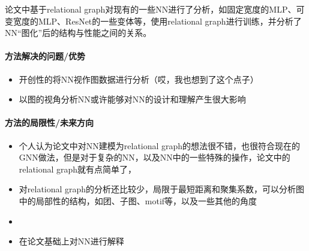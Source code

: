 论文中基于relational graph对现有的一些NN进行了分析，如固定宽度的MLP、可变宽度的MLP、ResNet的一些变体等，使用relational graph进行训练，并分析了NN“图化”后的结构与性能之间的关系。

\paragraph{方法解决的问题/优势}
\begin{itemize}
	\item 开创性的将NN视作图数据进行分析（哎，我也想到了这个点子）
	\item 以图的视角分析NN或许能够对NN的设计和理解产生很大影响

\end{itemize}

\paragraph{方法的局限性/未来方向}
\begin{itemize}
	\item 个人认为论文中对NN建模为relational graph的想法很不错，也很符合现在的GNN做法，但是对于复杂的NN，以及NN中的一些特殊的操作，论文中的relational graph就有点简单了，
	\item 对relational graph的分析还比较少，局限于最短距离和聚集系数，可以分析图中的局部性的结构，如团、子图、motif等，以及一些其他的角度
	\item {}
	\item 在论文基础上对NN进行解释
\end{itemize}



